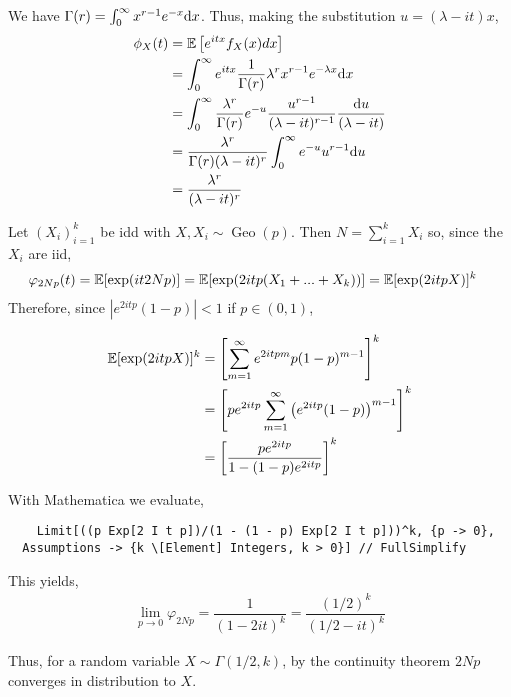 \begin{solution}[Solution]
We have \( \Gamma(r) = \int_{0}^{\infty} x^{r-1}e^{-x}\mathrm{d} x \). Thus, making the substitution \( u=(\lambda-it)x \),
\begin{align*}
    \phi_X(t) &= \mathbb{E}\left[ e^{itx}f_X(x)dx \right] \\ 
    &= \int_{0}^{\infty} e^{itx} \dfrac{1}{\Gamma(r)}\lambda^r x^{r-1}e^{-\lambda x} \mathrm{d} x \\
    &= \int_{0}^{\infty} \dfrac{\lambda^r}{\Gamma(r)}e^{-u} \dfrac{u^{r-1}}{(\lambda-it)^{r-1}} \dfrac{\mathrm{d} u}{(\lambda-it)} \\
    &= \dfrac{\lambda^r}{\Gamma(r)(\lambda-it)^r}\int_{0}^{\infty} e^{-u}u^{r-1} \mathrm{d} u \\
    &= \dfrac{\lambda^r}{(\lambda-it)^r}
\end{align*}


Let \( (X_i)_{i=1}^{k} \) be idd  with \( X,X_i\sim \operatorname{Geo}(p) \).
Then \( N=\sum_{i=1}^{k} X_i \) so, since the \( X_i \) are iid,
\begin{align*}
    \varphi_{2Np}(t) &= \mathbb{E}[\exp(it2Np)] 
    =\mathbb{E}[\exp(2itp(X_1+...+X_k))] 
    =\mathbb{E}[\exp(2itpX)]^k 
\end{align*}
Therefore, since \( |e^{2itp}(1-p)|<1 \) if \( p\in(0,1) \),

\begin{align*}
    \mathbb{E}[\exp(2itpX)]^k 
    &= \left[ \sum_{m=1}^{\infty} e^{2itpm}p(1-p)^{m-1} \right]^k 
    \\&= \left[ pe^{2itp}\sum_{m=1}^{\infty}\left(e^{2itp}(1-p)\right)^{m-1} \right]^k 
    \\&= \left[ \dfrac{pe^{2itp}}{1-(1-p)e^{2itp}} \right]^k
\end{align*}

With Mathematica we evaluate,
\begin{lstlisting}
    Limit[((p Exp[2 I t p])/(1 - (1 - p) Exp[2 I t p]))^k, {p -> 0}, 
  Assumptions -> {k \[Element] Integers, k > 0}] // FullSimplify
\end{lstlisting}

This yields,
\begin{align*}
    \lim_{p\to 0} \varphi_{2Np} = \dfrac{1}{(1-2it)^k} = \dfrac{(1/2)^k}{(1/2-it)^k}
\end{align*}

Thus, for a random variable \( X\sim\Gamma(1/2,k) \), by the continuity theorem \( 2Np \) converges in distribution to \( X \).

\end{solution}

